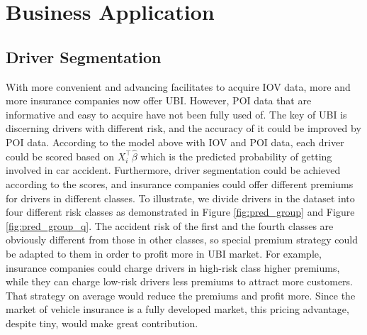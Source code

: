 \documentclass[sii]{ipart}
\theoremstyle{plain}
\begin{document}
\section{Business Application}

\subsection{Driver Segmentation}
With more convenient and advancing facilitates to acquire IOV data, more and more insurance companies now offer UBI. However, POI data that are informative and easy to acquire have not been fully used of. The key of UBI is discerning drivers with different risk, and the accuracy of it could be improved by POI data. According to the model above with IOV and POI data, each driver could be scored based on $X_{i}^\top\hat{\beta}$ which is the predicted probability of getting involved in car accident. Furthermore, driver segmentation could be achieved according to the scores, and insurance companies could offer different premiums for drivers in different classes. To illustrate, we divide drivers in the dataset into four different risk classes as demonstrated in Figure \ref{fig:pred_group} and Figure \ref{fig:pred_group_q}. The accident risk of the first and the fourth classes are obviously different from those in other classes, so special premium strategy could be adapted to them in order to profit more in UBI market. For example, insurance companies could charge drivers in high-risk class higher premiums, while they can charge low-risk drivers less premiums to attract more customers. That strategy on average would reduce the premiums and profit more. Since the market of vehicle insurance is a fully developed market, this pricing advantage, despite tiny, would make great contribution. 
\end{document}
